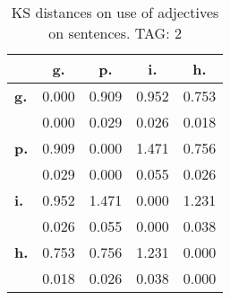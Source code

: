 \begin{table}[h!]
\begin{center}
\begin{tabular}{| l || c | c | c | c |}\hline
 & {\bf g.} & {\bf p.} & {\bf i.} & {\bf h.} \\\hline\hline
{\bf g.} & 0.000 & 0.909 & 0.952 & 0.753 \\
{\bf } & 0.000 & 0.029 & 0.026 & 0.018 \\\hline
{\bf p.} & 0.909 & 0.000 & 1.471 & 0.756 \\
{\bf } & 0.029 & 0.000 & 0.055 & 0.026 \\\hline
{\bf i.} & 0.952 & 1.471 & 0.000 & 1.231 \\
{\bf } & 0.026 & 0.055 & 0.000 & 0.038 \\\hline
{\bf h.} & 0.753 & 0.756 & 1.231 & 0.000 \\
{\bf } & 0.018 & 0.026 & 0.038 & 0.000 \\\hline
\end{tabular}
\caption{KS distances on use of adjectives on sentences. TAG: 2}
\end{center}
\end{table}